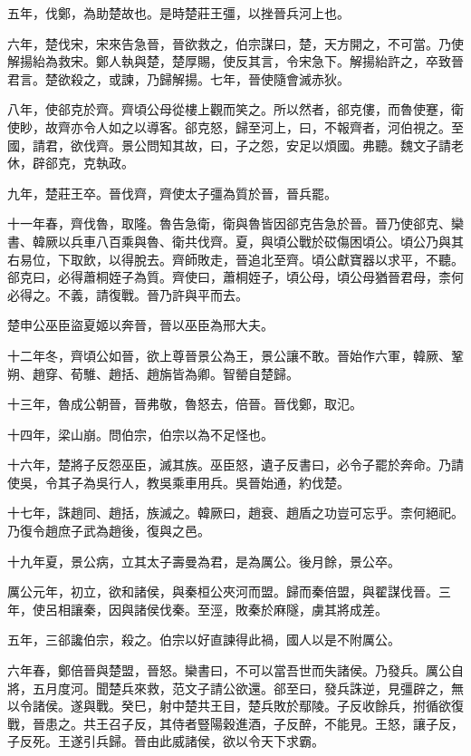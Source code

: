 五年，伐鄭，為助楚故也。是時楚莊王彊，以挫晉兵河上也。

六年，楚伐宋，宋來告急晉，晉欲救之，伯宗謀曰，楚，天方開之，不可當。乃使解揚紿為救宋。鄭人執與楚，楚厚賜，使反其言，令宋急下。解揚紿許之，卒致晉君言。楚欲殺之，或諫，乃歸解揚。七年，晉使隨會滅赤狄。

八年，使郤克於齊。齊頃公母從樓上觀而笑之。所以然者，郤克僂，而魯使蹇，衛使眇，故齊亦令人如之以導客。郤克怒，歸至河上，曰，不報齊者，河伯視之。至國，請君，欲伐齊。景公問知其故，曰，子之怨，安足以煩國。弗聽。魏文子請老休，辟郤克，克執政。

九年，楚莊王卒。晉伐齊，齊使太子彊為質於晉，晉兵罷。

十一年春，齊伐魯，取隆。魯告急衛，衛與魯皆因郤克告急於晉。晉乃使郤克、欒書、韓厥以兵車八百乘與魯、衛共伐齊。夏，與頃公戰於砹傷困頃公。頃公乃與其右易位，下取飲，以得脫去。齊師敗走，晉追北至齊。頃公獻寶器以求平，不聽。郤克曰，必得蕭桐姪子為質。齊使曰，蕭桐姪子，頃公母，頃公母猶晉君母，柰何必得之。不義，請復戰。晉乃許與平而去。

楚申公巫臣盜夏姬以奔晉，晉以巫臣為邢大夫。

十二年冬，齊頃公如晉，欲上尊晉景公為王，景公讓不敢。晉始作六軍，韓厥、鞏朔、趙穿、荀騅、趙括、趙旃皆為卿。智罃自楚歸。

十三年，魯成公朝晉，晉弗敬，魯怒去，倍晉。晉伐鄭，取氾。

十四年，梁山崩。問伯宗，伯宗以為不足怪也。

十六年，楚將子反怨巫臣，滅其族。巫臣怒，遺子反書曰，必令子罷於奔命。乃請使吳，令其子為吳行人，教吳乘車用兵。吳晉始通，約伐楚。

十七年，誅趙同、趙括，族滅之。韓厥曰，趙衰、趙盾之功豈可忘乎。柰何絕祀。乃復令趙庶子武為趙後，復與之邑。

十九年夏，景公病，立其太子壽曼為君，是為厲公。後月餘，景公卒。

厲公元年，初立，欲和諸侯，與秦桓公夾河而盟。歸而秦倍盟，與翟謀伐晉。三年，使呂相讓秦，因與諸侯伐秦。至涇，敗秦於麻隧，虜其將成差。

五年，三郤讒伯宗，殺之。伯宗以好直諫得此禍，國人以是不附厲公。

六年春，鄭倍晉與楚盟，晉怒。欒書曰，不可以當吾世而失諸侯。乃發兵。厲公自將，五月度河。聞楚兵來救，范文子請公欲還。郤至曰，發兵誅逆，見彊辟之，無以令諸侯。遂與戰。癸巳，射中楚共王目，楚兵敗於鄢陵。子反收餘兵，拊循欲復戰，晉患之。共王召子反，其侍者豎陽穀進酒，子反醉，不能見。王怒，讓子反，子反死。王遂引兵歸。晉由此威諸侯，欲以令天下求霸。

